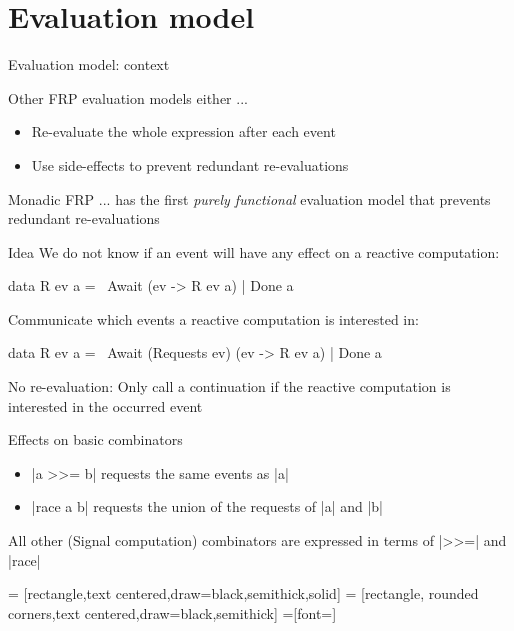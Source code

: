 \documentclass{beamer}
\begin{document}
\section{Evaluation model}
\begin{frame}{Evaluation model: context}
\begin{block}{Other FRP evaluation models either ...}
\begin{itemize}
\item Re-evaluate the whole expression after each event
\item Use side-effects to prevent redundant re-evaluations
\end{itemize}
\end{block}
\pause
\begin{block}{Monadic FRP ...}
has the first \emph{purely functional} evaluation model that prevents redundant re-evaluations
\end{block}
\end{frame}

\begin{frame}{Idea}
We do not know if an event will have any effect on a reactive computation:
\begin{code}
data R ev a  =~  Await (ev -> R ev a) 
             |   Done a
\end{code}
\pause
Communicate which events a reactive computation is interested in:
\begin{code}
data R ev a  =~  Await (Requests ev) (ev -> R ev a) 
             |   Done a
\end{code}
No re-evaluation: Only call a continuation if the reactive computation is interested in the occurred event

\end{frame}

\begin{frame}{Effects on basic combinators}

\begin{itemize}
\item |a >>= b| requests the same events as |a|
\item |race a b| requests the union of the requests of |a| and |b| 
\end{itemize}
All other (Signal computation) combinators are expressed in terms of |>>=| and |race|

\end{frame}

\centering
{} = [rectangle,text centered,draw=black,semithick,solid]
 = [rectangle, rounded corners,text centered,draw=black,semithick]
 =[font=\small]
\end{document}

